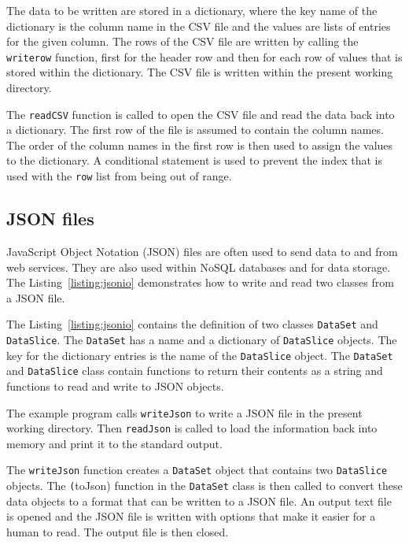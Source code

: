 \documentclass[11pt,a4paper]{article}
\begin{document}
The data to be written are stored in a dictionary, where the key name of the dictionary is the column name in the CSV file and the values are lists of entries for the given column.  The rows of the CSV file are written by calling the \texttt{writerow} function, first for the header row and then for each row of values that is stored within the dictionary.  The CSV file is written within the present working directory.

The \texttt{readCSV} function is called to open the CSV file and read the data back into a dictionary.  The first row of the file is assumed to contain the column names.  The order of the column names in the first row is then used to assign the values to the dictionary.  A conditional statement is used to prevent the index that is used with the \texttt{row} list from being out of range.

\subsection{JSON files}

JavaScript Object Notation (JSON) files are often used to send data to and from web services.  They are also used within NoSQL databases and for data storage.  The Listing~\ref{listing:jsonio} demonstrates how to write and read two classes from a JSON file.



The Listing~\ref{listing:jsonio} contains the definition of two classes \texttt{DataSet} and \texttt{DataSlice}.  The \texttt{DataSet} has a name and a dictionary of \texttt{DataSlice} objects.  The key for the dictionary entries is the name of the \texttt{DataSlice} object.  The \texttt{DataSet} and \texttt{DataSlice} class contain functions to return their contents as a string and functions to read and write to JSON objects.

The example program calls \texttt{writeJson} to write a JSON file in the present working directory.  Then \texttt{readJson} is called to load the information back into memory and print it to the standard output.

The \texttt{writeJson} function creates a \texttt{DataSet} object that contains two \texttt{DataSlice} objects.  The \texttt(toJson) function in the \texttt{DataSet} class is then called to convert these data objects to a format that can be written to a JSON file. An output text file is opened and the JSON file is written with options that make it easier for a human to read.  The output file is then closed.
\end{document}
